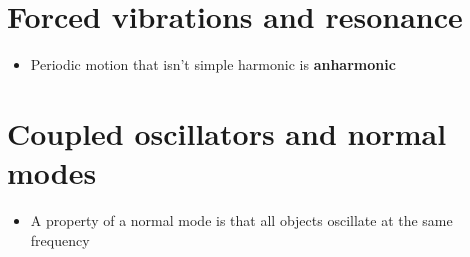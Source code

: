 \documentclass{article}
\begin{document}
\section{Forced vibrations and resonance}

\begin{itemize}
  \item Periodic motion that isn't simple harmonic is \textbf{anharmonic}
\end{itemize}

\section{Coupled oscillators and normal modes}

\begin{itemize}
  \item A property of a normal mode is that all objects oscillate at the same frequency
\end{itemize}
\end{document}
